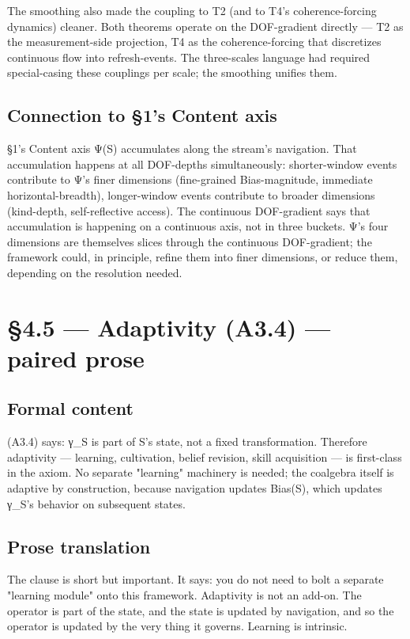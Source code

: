 \documentclass[11pt, openany]{book}
\newcommand{\sectionbreak}{\clearpage}
\begin{document}
The smoothing also made the coupling to T2 (and to T4's coherence-forcing dynamics) cleaner. Both theorems operate on the DOF-gradient directly --- T2 as the measurement-side projection, T4 as the coherence-forcing that discretizes continuous flow into refresh-events. The three-scales language had required special-casing these couplings per scale; the smoothing unifies them.

\subsection{Connection to §1's Content axis}

§1's Content axis Ψ(S) accumulates along the stream's navigation. That accumulation happens at all DOF-depths simultaneously: shorter-window events contribute to Ψ's finer dimensions (fine-grained Bias-magnitude, immediate horizontal-breadth), longer-window events contribute to broader dimensions (kind-depth, self-reflective access). The continuous DOF-gradient says that accumulation is happening on a continuous axis, not in three buckets. Ψ's four dimensions are themselves slices through the continuous DOF-gradient; the framework could, in principle, refine them into finer dimensions, or reduce them, depending on the resolution needed.

\sectionbreak

\section{§4.5 --- Adaptivity (A3.4) --- paired prose}

\subsection{Formal content}

(A3.4) says: γ\_\allowbreak{}S is part of S's state, not a fixed transformation. Therefore adaptivity --- learning, cultivation, belief revision, skill acquisition --- is first-class in the axiom. No separate "learning" machinery is needed; the coalgebra itself is adaptive by construction, because navigation updates Bias(S), which updates γ\_\allowbreak{}S's behavior on subsequent states.

\subsection{Prose translation}

The clause is short but important. It says: you do not need to bolt a separate "learning module" onto this framework. Adaptivity is not an add-on. The operator is part of the state, and the state is updated by navigation, and so the operator is updated by the very thing it governs. Learning is intrinsic.
\end{document}
